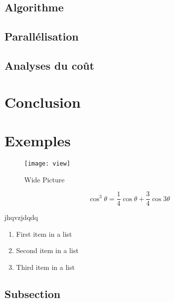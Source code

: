 \documentclass[fleqn,10pt]{SelfArx} %
\begin{document}
\subsection{Algorithme}
\subsection{Parallélisation}
\subsection{Analyses du coût}


\section*{Conclusion}




\section{Exemples}

\begin{figure*}[ht]\centering %
	\texttt{[image: view]}
	\caption{Wide Picture}
	\label{fig:view}
\end{figure*}



\begin{equation}
	\cos^3 \theta =\frac{1}{4}\cos\theta+\frac{3}{4}\cos 3\theta
	\label{eq:refname2}
\end{equation}

jhqvzjdqdq

\begin{enumerate}[noitemsep] %
	\item First item in a list
	\item Second item in a list
	\item Third item in a list
\end{enumerate}

\subsection{Subsection}
\end{document}
